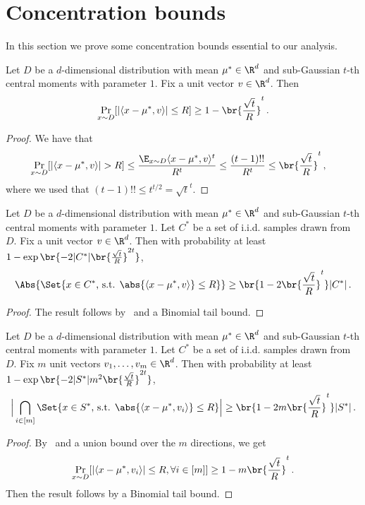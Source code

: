 \section{Concentration bounds}

In this section we prove some concentration bounds essential to our analysis.

\begin{lemma}
\label{lem:conc-general}
Let $D$ be a $d$-dimensional distribution with mean $\mu^* \in \R^d$ and sub-Gaussian $t$-th central moments with parameter $1$.
Fix a unit vector $v \in \R^d$.
Then
\[\Pr_{x \sim D}[|\langle x - \mu^*, v\rangle| \leq R] \geq 1 - \br{\frac{\sqrt{t}}{R}}^t\,.\]
\end{lemma}
\begin{proof}
We have that
\begin{align*}
    \Pr_{x \sim D}[|\langle x - \mu^*, v\rangle| > R]
    &\leq \frac{\E_{x \sim D} \langle x - \mu^*, v\rangle^t }{R^t}
    \leq \frac{(t-1)!!}{R^t}
    \leq \br{\frac{\sqrt{t}}{R}}^t\,,
\end{align*}
where we used that $(t-1)!! \leq t^{t/2} = \sqrt{t}^t$.
\end{proof}

\begin{lemma}
\label{lem:conc-one-dir}
Let $D$ be a $d$-dimensional distribution with mean $\mu^* \in \R^d$ and sub-Gaussian $t$-th central moments with parameter $1$.
Let $C^*$ be a set of i.i.d. samples drawn from $D$.
Fix a unit vector $v \in \R^d$.
Then with probability at least $1-\exp\br{-2|C^*|\br{\frac{\sqrt{t}}{R}}^{2t}}$,
\[\Abs{\Set{x \in C^* \text{, s.t. } \abs{\langle x - \mu^*, v\rangle} \leq R}} \geq \br{1-2\br{\frac{\sqrt{t}}{R}}^t}|C^*|\,.\]
\end{lemma}
\begin{proof}
The result follows by~ and a Binomial tail bound.
\end{proof}

\begin{lemma}
\label{lem:conc-all-dir}
Let $D$ be a $d$-dimensional distribution with mean $\mu^* \in \R^d$ and sub-Gaussian $t$-th central moments with parameter $1$.
Let $C^*$ be a set of i.i.d. samples drawn from $D$.
Fix $m$ unit vectors $v_1, \ldots, v_m \in \R^d$.
Then with probability at least $1-\exp\br{-2|S^*|m^2\br{\frac{\sqrt{t}}{R}}^{2t}}$,
\[\Big| \bigcap_{i \in [m]}\Set{x \in S^* \text{, s.t. } \abs{\langle x - \mu^*, v_{i}\rangle} \leq R} \Big| \geq \br{1-2m\br{\frac{\sqrt{t}}{R}}^t}|S^*|\,.\]
\end{lemma}
\begin{proof}
By~ and a union bound over the $m$ directions, we get
\[\Pr_{x \sim D}[|\langle x - \mu^*, v_i\rangle| \leq R, \forall i \in [m]] \geq 1 - m\br{\frac{\sqrt{t}}{R}}^t\,.\]
Then the result follows by a Binomial tail bound.
\end{proof}